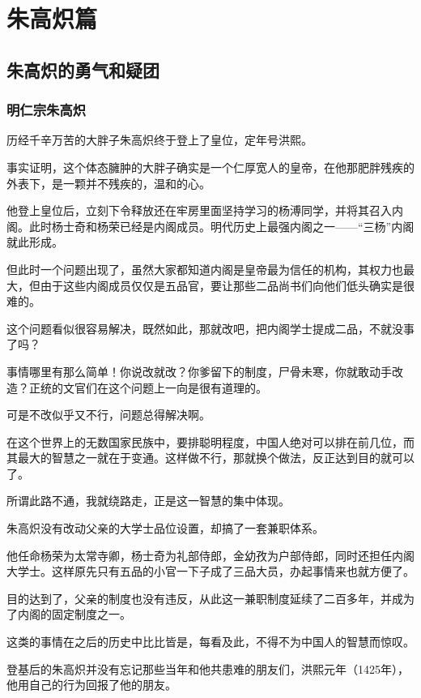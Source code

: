 \chapter*{朱高炽篇}
\section{朱高炽的勇气和疑团}
\ifnum{}
	\begin{multicols}{\theparacolNo}
\fi
\subsection{明仁宗朱高炽}
历经千辛万苦的大胖子朱高炽终于登上了皇位，定年号洪熙。

事实证明，这个体态臃肿的大胖子确实是一个仁厚宽人的皇帝，在他那肥胖残疾的外表下，是一颗并不残疾的，温和的心。

他登上皇位后，立刻下令释放还在牢房里面坚持学习的杨溥同学，并将其召入内阁。此时杨士奇和杨荣已经是内阁成员。明代历史上最强内阁之一——“三杨”内阁就此形成。

但此时一个问题出现了，虽然大家都知道内阁是皇帝最为信任的机构，其权力也最大，但由于这些内阁成员仅仅是五品官，要让那些二品尚书们向他们低头确实是很难的。

这个问题看似很容易解决，既然如此，那就改吧，把内阁学士提成二品，不就没事了吗？

事情哪里有那么简单！你说改就改？你爹留下的制度，尸骨未寒，你就敢动手改造？正统的文官们在这个问题上一向是很有道理的。

可是不改似乎又不行，问题总得解决啊。

在这个世界上的无数国家民族中，要排聪明程度，中国人绝对可以排在前几位，而其最大的智慧之一就在于变通。这样做不行，那就换个做法，反正达到目的就可以了。

所谓此路不通，我就绕路走，正是这一智慧的集中体现。

朱高炽没有改动父亲的大学士品位设置，却搞了一套兼职体系。

他任命杨荣为太常寺卿，杨士奇为礼部侍郎，金幼孜为户部侍郎，同时还担任内阁大学士。这样原先只有五品的小官一下子成了三品大员，办起事情来也就方便了。

目的达到了，父亲的制度也没有违反，从此这一兼职制度延续了二百多年，并成为了内阁的固定制度之一。

这类的事情在之后的历史中比比皆是，每看及此，不得不为中国人的智慧而惊叹。

登基后的朱高炽并没有忘记那些当年和他共患难的朋友们，洪熙元年（1425年），他用自己的行为回报了他的朋友。


\end{multicols}
